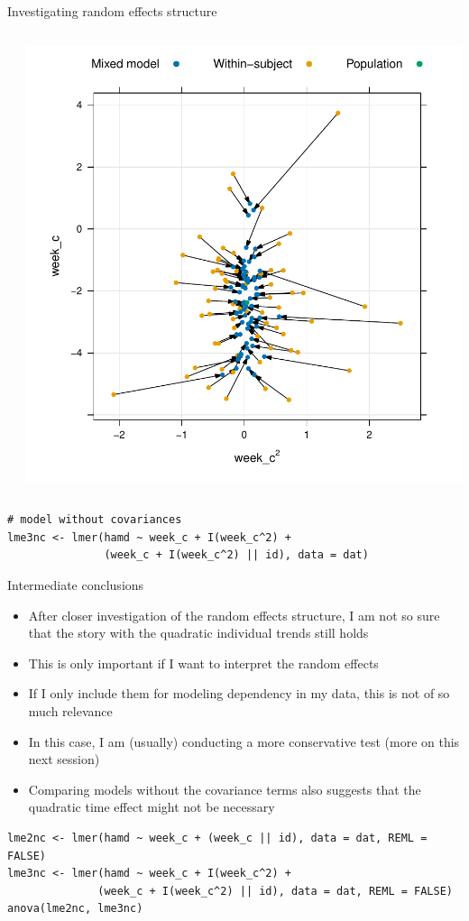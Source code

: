 \documentclass[aspectratio=169]{beamer}
\begin{document}
\begin{frame}[fragile]{Investigating random effects structure}
\begin{columns}
\begin{column}{.35\textwidth}
    \end{column}
    \begin{column}{.35\textwidth}
      \includegraphics[scale=.35]{../figures/hdrs_shrinkage_week-weeksq_noncorr}
    \end{column}
  \end{columns}
\begin{lstlisting}
# model without covariances
lme3nc <- lmer(hamd ~ week_c + I(week_c^2) +
               (week_c + I(week_c^2) || id), data = dat)
\end{lstlisting}
\end{frame}


\begin{frame}[fragile]{Intermediate conclusions}
  \begin{itemize}
    \item After closer investigation of the random effects structure, I am not
      so sure that the story with the quadratic individual trends still holds
    \item This is only important if I want to interpret the random effects
    \item If I only include them for modeling dependency in my data, this is
      not of so much relevance
    \item In this case, I am (usually) conducting a more conservative test (more
      on this next session)
    \item Comparing models without the covariance terms also suggests that the
      quadratic time effect might not be necessary
  \end{itemize}
\begin{lstlisting}
lme2nc <- lmer(hamd ~ week_c + (week_c || id), data = dat, REML = FALSE)
lme3nc <- lmer(hamd ~ week_c + I(week_c^2) +
              (week_c + I(week_c^2) || id), data = dat, REML = FALSE)
anova(lme2nc, lme3nc)
\end{lstlisting}
\end{frame}
\end{document}
